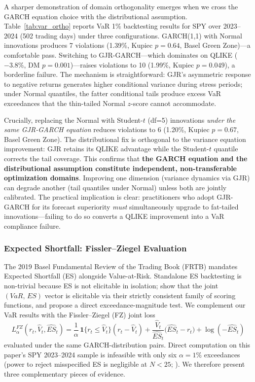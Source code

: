 A sharper demonstration of domain orthogonality emerges when we cross the GARCH equation choice with the distributional assumption. Table~\ref{tab:var_ortho} reports VaR 1\% backtesting results for SPY over 2023--2024 (502 trading days) under three configurations. GARCH(1,1) with Normal innovations produces 7 violations (1.39\%, Kupiec $p = 0.64$, Basel Green Zone)---a comfortable pass. Switching to GJR-GARCH---which dominates on QLIKE ($-3.8\%$, DM $p = 0.001$)---raises violations to 10 (1.99\%, Kupiec $p = 0.049$), a borderline failure. The mechanism is straightforward: GJR's asymmetric response to negative returns generates higher conditional variance during stress periods; under Normal quantiles, the fatter conditional tails produce excess VaR exceedances that the thin-tailed Normal $z$-score cannot accommodate.

Crucially, replacing the Normal with Student-$t$ (df=5) innovations \textit{under the same GJR-GARCH equation} reduces violations to 6 (1.20\%, Kupiec $p = 0.67$, Basel Green Zone). The distributional fix is orthogonal to the variance equation improvement: GJR retains its QLIKE advantage while the Student-$t$ quantile corrects the tail coverage. This confirms that \textbf{the GARCH equation and the distributional assumption constitute independent, non-transferable optimization domains}. Improving one dimension (variance dynamics via GJR) can degrade another (tail quantiles under Normal) unless both are jointly calibrated. The practical implication is clear: practitioners who adopt GJR-GARCH for its forecast superiority \textit{must} simultaneously upgrade to fat-tailed innovations---failing to do so converts a QLIKE improvement into a VaR compliance failure.

\subsubsection{Expected Shortfall: Fissler--Ziegel Evaluation}

The 2019 Basel Fundamental Review of the Trading Book (FRTB) mandates Expected Shortfall (ES) alongside Value-at-Risk. Standalone ES backtesting is non-trivial because ES is not elicitable in isolation; \citet{fisslerziegel2016} show that the joint $(V\!aR,\,ES)$ vector is elicitable via their strictly consistent family of scoring functions, and \citet{acerbiszekely2014} propose a direct exceedance-magnitude test. We complement our VaR results with the Fissler--Ziegel (FZ) joint loss
\begin{equation}
L^{FZ}_{\alpha}(r_t, \widehat{V}_t, \widehat{ES}_t) = \frac{1}{\alpha}\,\mathbf{1}\{r_t \le \widehat{V}_t\}(r_t - \widehat{V}_t) + \frac{\widehat{V}_t}{\widehat{ES}_t}\bigl(\widehat{ES}_t - r_t\bigr) + \log(-\widehat{ES}_t)
\label{eq:fz}
\end{equation}
evaluated under the same GARCH-distribution pairs. Direct computation on this paper's SPY 2023--2024 sample is infeasible with only six $\alpha = 1\%$ exceedances (power to reject misspecified ES is negligible at $N < 25$; \citealt{bayerdimitriadis2022}). We therefore present three complementary pieces of evidence.

